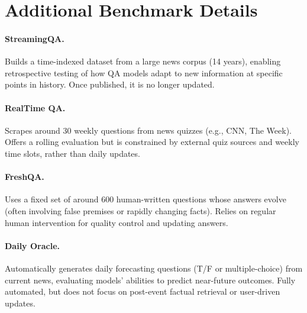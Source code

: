 \documentclass[11pt]{article}
\begin{document}



\appendix

\clearpage

\startcontents[appendix]

\clearpage

\section{Additional Benchmark Details}
\label{sec:detailed_benchmarks}

\paragraph{StreamingQA.}
Builds a time-indexed dataset from a large news corpus (14 years), enabling retrospective testing of how QA models adapt to new information at specific points in history. Once published, it is no longer updated.

\paragraph{RealTime QA.}
Scrapes around 30 weekly questions from news quizzes (e.g., CNN, The Week). Offers a rolling evaluation but is constrained by external quiz sources and weekly time slots, rather than daily updates.

\paragraph{FreshQA.}
Uses a fixed set of around 600 human-written questions whose answers evolve (often involving false premises or rapidly changing facts). Relies on regular human intervention for quality control and updating answers.

\paragraph{Daily Oracle.}
Automatically generates daily forecasting questions (T/F or multiple-choice) from current news, evaluating models' abilities to predict near-future outcomes. Fully automated, but does not focus on post-event factual retrieval or user-driven updates.
\end{document}
